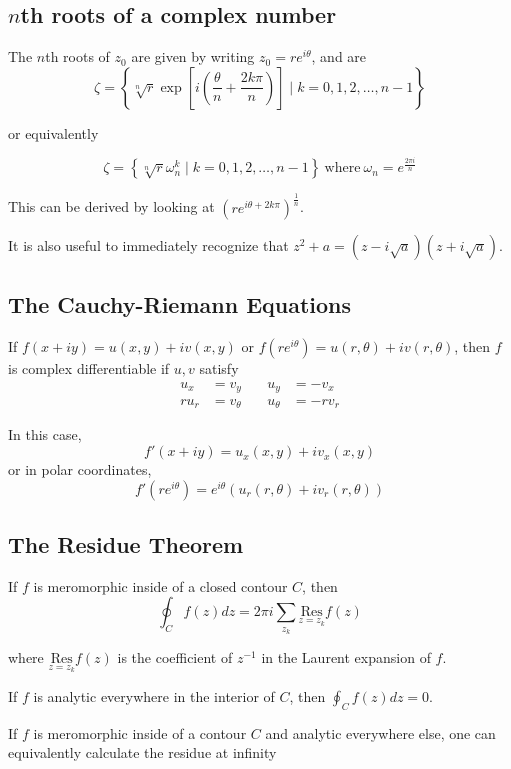 \documentclass{article}
\begin{document}
\subsection{$n$th roots of a complex number}
The $n$th roots of $z_0$ are given by writing $z_0 = re^{i\theta}$, and are 
\[\zeta = \left\{ \sqrt[n]{r} \exp\left[{i\left( \frac{\theta}{n} + \frac{2k\pi}{n}\right)}\right] \mid k = 0,1,2,\ldots, n-1\right\}\]

or equivalently

\[\zeta = \left\{ \sqrt[n]{r}\omega_n^k \mid k = 0,1,2,\ldots, n-1\right\}~\text{where}~\omega_n = e^{\frac{2\pi i}{n}}\]

This can be derived by looking at $\left( re^{i\theta + 2k\pi}\right)^{\frac{1}{n}}$.

It is also useful to immediately recognize that $z^2+a = (z-i\sqrt{a})(z+i\sqrt{a})$.

\subsection{The Cauchy-Riemann Equations}

If $f(x+iy) = u(x,y) + iv(x,y)$ or $f(re^{i\theta}) = u(r,\theta) + iv(r,\theta)$, then $f$ is complex differentiable if $u,v$ satisfy 
\begin{align*}
    u_x &= v_y &\quad u_y &= -v_x \\
    ru_r &= v_\theta &\quad u_\theta &= -rv_r
\end{align*}

In this case, 
\[
f'(x+iy) = u_x(x,y) + iv_x(x,y)
\] 
or in polar coordinates, 
\[
f'(re^{i\theta}) = e^{i\theta}(u_r(r,\theta) + iv_r(r,\theta))
\]

\subsection{The Residue Theorem}


If $f$ is meromorphic inside of a closed contour $C$, then
\[ 
\oint_C f(z) dz = 2\pi i \sum_{z_k} \underset{z=z_k}{\text{Res}} f(z)
\]

where $\underset{z=z_k}{\text{Res}} f(z)$ is the coefficient of $z^{-1}$ in the Laurent expansion of $f$.

If $f$ is analytic everywhere in the interior of $C$, then $\oint_C f(z) dz = 0$.


If $f$ is meromorphic inside of a contour $C$ and analytic everywhere else, one can equivalently calculate the residue at infinity
\end{document}
